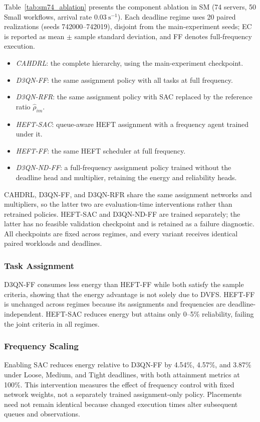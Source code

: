 \documentclass[journal]{IEEEtran}
\begin{document}
Table~\ref{tab:sm74_ablation} presents the component ablation in SM (74 servers, 50 Small workflows, arrival rate $0.03~\mathrm{s}^{-1}$). Each deadline regime uses 20 paired realizations (seeds 742000--742019), disjoint from the main-experiment seeds; EC is reported as mean $\pm$ sample standard deviation, and FF denotes full-frequency execution.
\begin{itemize}
\item \emph{CAHDRL}: the complete hierarchy, using the main-experiment checkpoint.
\item \emph{D3QN-FF}: the same assignment policy with all tasks at full frequency.
\item \emph{D3QN-RFR}: the same assignment policy with SAC replaced by the reference ratio $\widehat\rho_{im}$.
\item \emph{HEFT-SAC}: queue-aware HEFT assignment with a frequency agent trained under it.
\item \emph{HEFT-FF}: the same HEFT scheduler at full frequency.
\item \emph{D3QN-ND-FF}: a full-frequency assignment policy trained without the deadline head and multiplier, retaining the energy and reliability heads.
\end{itemize}
CAHDRL, D3QN-FF, and D3QN-RFR share the same assignment networks and multipliers, so the latter two are evaluation-time interventions rather than retrained policies. HEFT-SAC and D3QN-ND-FF are trained separately; the latter has no feasible validation checkpoint and is retained as a failure diagnostic. All checkpoints are fixed across regimes, and every variant receives identical paired workloads and deadlines.

\subsubsection{Task Assignment}
D3QN-FF consumes less energy than HEFT-FF while both satisfy the sample criteria, showing that the energy advantage is not solely due to DVFS. HEFT-FF is unchanged across regimes because its assignments and frequencies are deadline-independent. HEFT-SAC reduces energy but attains only 0--5\% reliability, failing the joint criteria in all regimes.

\subsubsection{Frequency Scaling}
Enabling SAC reduces energy relative to D3QN-FF by 4.54\%, 4.57\%, and 3.87\% under Loose, Medium, and Tight deadlines, with both attainment metrics at 100\%. This intervention measures the effect of frequency control with fixed network weights, not a separately trained assignment-only policy. Placements need not remain identical because changed execution times alter subsequent queues and observations.
\end{document}
